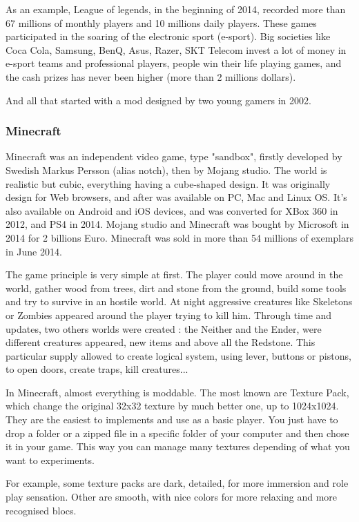 \documentclass[a4paper,12pt]{article}
\begin{document}
As an example,  League of legends, in the beginning of 2014, recorded more than 67 millions of monthly players and 10 millions daily players. These games participated in the soaring of the electronic sport (e-sport). Big societies like Coca Cola, Samsung, BenQ, Asus, Razer, SKT Telecom invest a lot of money in e-sport teams and professional players, people win their life playing games, and the cash prizes has never been higher (more than 2 millions dollars).

And all that started with a mod designed by two young gamers in 2002.

\subsubsection{Minecraft}

Minecraft was an independent video game, type "sandbox", firstly developed by Swedish Markus Persson (alias notch), then by Mojang studio. The world is realistic but cubic, everything having a cube-shaped design. It was originally design for Web browsers, and after was available on PC, Mac and Linux OS. It's also available on Android and iOS devices, and was converted for XBox 360 in 2012, and PS4 in 2014.
Mojang studio and Minecraft was  bought by Microsoft in 2014 for 2 billions Euro.
Minecraft was sold in more than 54 millions of exemplars in June 2014.

The game principle is very simple at first. The player could move around in the world, gather wood from trees, dirt and stone from the ground, build some tools and try to survive in an hostile world. At night aggressive creatures like Skeletons or Zombies appeared around the player trying to kill him.
Through time and updates, two others worlds were created : the Neither and the Ender, were different creatures appeared, new items and above all the Redstone. This particular supply allowed to create logical system, using lever, buttons or pistons, to open doors, create traps, kill creatures...

In Minecraft, almost everything is moddable. The most known are Texture Pack, which change the original 32x32 texture by much better one, up to 1024x1024. They are the easiest to implements and use as a basic player. You just have to drop a folder or a zipped file in a specific folder of your computer and then chose it in your game. This way you can manage many textures depending of what you want to experiments.

For example, some texture packs are dark, detailed, for more immersion and role play sensation. Other are smooth, with nice colors for more relaxing and more recognised blocs.
\end{document}

